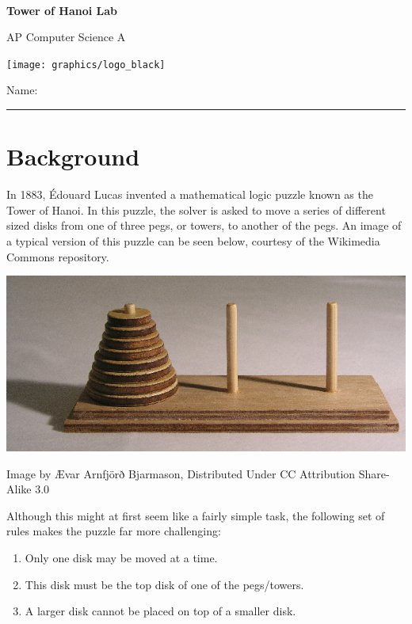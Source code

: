 
\usepackage[utf8]{inputenc}

\def\LabCourse{AP Computer Science A}
\def\LabNumber{07}
\def\LabTitle{Tower of Hanoi Lab}


	\begin{coverpages}
		\ \\[2cm]
		\begin{center}
			\huge
			\textbf{\LabTitle}

			\Large
			\LabCourse
		\end{center}

		\vspace{1.5cm}

		\begin{center}
			\texttt{[image: graphics/logo\_black]}

			\vspace{2.5cm}

			\Large
			Name: \rule{11.5cm}{0.1pt}
		\end{center}
	\end{coverpages}

	\blankpage

	\thispagestyle{empty}
	\tableofcontents

	\pagebreak

	\section{Background}
		In 1883, Édouard Lucas invented a mathematical logic puzzle known as the Tower of Hanoi. In this puzzle, the solver is asked to move a series of different sized disks from one of three pegs, or towers, to another of the pegs. An image of a typical version of this puzzle can be seen below, courtesy of the Wikimedia Commons repository.
		\begin{center}
			\includegraphics[scale=0.30]{files/Tower_of_Hanoi}

			{\tiny Image by Ævar Arnfjörð Bjarmason, Distributed Under CC Attribution Share-Alike 3.0}
		\end{center}
		Although this might at first seem like a fairly simple task, the following set of rules makes the puzzle far more challenging:
		\begin{enumerate}
			\item Only one disk may be moved at a time.
			\item This disk must be the top disk of one of the pegs/towers.
			\item A larger disk cannot be placed on top of a smaller disk.
		\end{enumerate}

